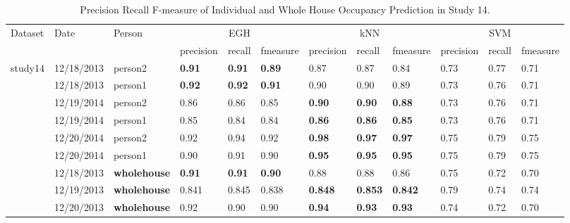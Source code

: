 
\begin{table*}[!t]
\hfill

\caption{Precision Recall F-measure of Individual and Whole House Occupancy Prediction in Study 14.}
\label{tab_resultsLimitation}
\centering
\small
\setlength\tabcolsep{2pt}
\begin{tabular} {|l|l|l|l|l|l|l|l|l|l|l|l|}
\hline
\multirow{2}{*}{Dataset}&\multirow{2}{*}{Date}&\multirow{2}{*}{Person} & \multicolumn{3}{|c|}{EGH}&\multicolumn{3}{|c|}{kNN} & \multicolumn{3}{|c|}{SVM} \\
\cline{4-12}
&&& precision & recall &fmeasure &precision & recall & fmeasure &precision & recall & fmeasure  \\
\hline
\multirow{3}{*}{study14}  & 12/18/2013 & person2&  \textbf{0.91} &  \textbf{0.91} &  \textbf{0.89} & 0.87 & 0.87 & 0.84 & 0.73 & 0.77 & 0.71\\
\cline{2-12}
& 12/18/2013 & person1&  \textbf{0.92} &  \textbf{0.92} &  \textbf{0.91} & 0.90 & 0.90 & 0.89 & 0.73 & 0.76 & 0.71 \\
\cline{2-12}
& 12/19/2014 & person2& 0.86 & 0.86 & 0.85  & \textbf{0.90} & \textbf{0.90} & \textbf{0.88} & 0.73 & 0.76 & 0.71\\
\cline{2-12}
& 12/19/2014 & person1& 0.85 & 0.84 & 0.84  & \textbf{0.86} & \textbf{0.86} & \textbf{0.85} & 0.73 & 0.76 & 0.71 \\
\cline{2-12}
& 12/20/2014 & person2& 0.92 & 0.94 & 0.92  & \textbf{0.98} & \textbf{0.97} & \textbf{0.97} & 0.75 & 0.79 & 0.75 \\
\cline{2-12}
& 12/20/2014 & person1& 0.90 & 0.91 & 0.90  & \textbf{0.95} & \textbf{0.95} & \textbf{0.95} & 0.75 & 0.79 & 0.75\\
\cline{2-12}
& 12/18/2013 & \textbf{wholehouse}&  \textbf{0.91}& \textbf{0.91} & \textbf{0.90} & 0.88	& 0.88 & 0.86 & 0.75 & 0.72 & 0.70 \\
\cline{2-12}
& 12/19/2013 & \textbf{wholehouse} & 0.841	& 0.845 & 0.838&  \textbf{0.848}& \textbf{0.853} & \textbf{0.842} & 0.79 & 0.74 & 0.74 \\
\cline{2-12}
& 12/20/2013 & \textbf{wholehouse} & 0.92	& 0.90 & 0.90&  \textbf{0.94}& \textbf{0.93} & \textbf{0.93} & 0.74 & 0.72 & 0.70 \\
\hline
\end{tabular}
\end{table*}